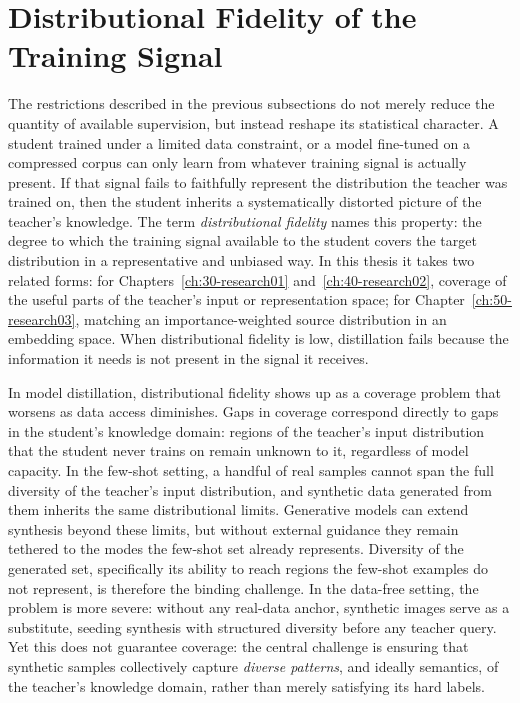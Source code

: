 \section{Distributional Fidelity of the Training Signal} \label{sec:14-introduction-fidelity}
\begin{foldable}
  The restrictions described in the previous subsections do not merely reduce the quantity of available supervision, but instead reshape its statistical character.
  A student trained under a limited data constraint, or a model fine-tuned on a compressed corpus can only learn from whatever training signal is actually present.
  If that signal fails to faithfully represent the distribution the teacher was trained on, then the student inherits a systematically distorted picture of the teacher's knowledge.
  The term \textit{distributional fidelity} names this property: the degree to which the training signal available to the student covers the target distribution in a representative and unbiased way.
  In this thesis it takes two related forms: for Chapters~\ref{ch:30-research01} and~\ref{ch:40-research02}, coverage of the useful parts of the teacher's input or representation space; for Chapter~\ref{ch:50-research03}, matching an importance-weighted source distribution in an embedding space.
  When distributional fidelity is low, distillation fails because the information it needs is not present in the signal it receives.
\end{foldable}

\begin{foldable}
  In model distillation, distributional fidelity shows up as a coverage problem that worsens as data access diminishes.
  Gaps in coverage correspond directly to gaps in the student's knowledge domain: regions of the teacher's input distribution that the student never trains on remain unknown to it, regardless of model capacity.
  In the few-shot setting, a handful of real samples cannot span the full diversity of the teacher's input distribution, and synthetic data generated from them inherits the same distributional limits.
  Generative models can extend synthesis beyond these limits, but without external guidance they remain tethered to the modes the few-shot set already represents.
  Diversity of the generated set, specifically its ability to reach regions the few-shot examples do not represent, is therefore the binding challenge.
  In the data-free setting, the problem is more severe: without any real-data anchor, synthetic images serve as a substitute, seeding synthesis with structured diversity before any teacher query.
  Yet this does not guarantee coverage: the central challenge is ensuring that synthetic samples collectively capture \textit{diverse patterns}, and ideally semantics, of the teacher's knowledge domain, rather than merely satisfying its hard labels.
\end{foldable}

